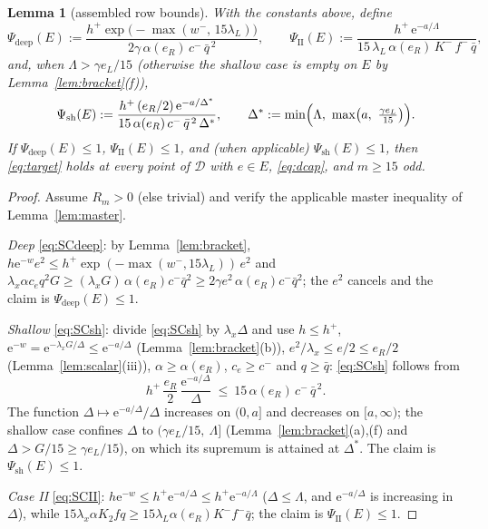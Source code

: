 \documentclass[11pt]{amsart}
\newtheorem{lemma}[theorem]{Lemma}
\newcommand{\eu}{\mathrm{e}}
\newcommand{\D}{\mathcal D}
\begin{document}
\begin{lemma}[assembled row bounds]\label{lem:rows}
With the constants above, define
\[
 \Psi_{\mathrm{deep}}(E):=
 \frac{h^+\exp\bigl(-\max(w^-,\,15\lambda_L)\bigr)}
      {2\gamma\,\alpha(e_R)\,c^-\,\bar q^{\,2}},
 \qquad
 \Psi_{\mathrm{II}}(E):=
 \frac{h^+\,\eu^{-a/\Lambda}}
      {15\,\lambda_L\,\alpha(e_R)\,K^-\,f^-\,\bar q},
\]
and, when $\Lambda>\gamma e_L/15$ (otherwise the shallow case is empty
on $E$ by Lemma~\ref{lem:bracket}(f)),
\[
 \Psi_{\mathrm{sh}}(E):=
 \frac{h^+\,(e_R/2)\,\eu^{-a/\Delta^*}}
      {15\,\alpha(e_R)\,c^-\,\bar q^{\,2}\,\Delta^*},
 \qquad
 \Delta^*:=\min\Bigl(\Lambda,\ \max\bigl(a,\ \tfrac{\gamma e_L}{15}\bigr)\Bigr).
\]
If $\Psi_{\mathrm{deep}}(E)\le1$, $\Psi_{\mathrm{II}}(E)\le1$, and (when
applicable) $\Psi_{\mathrm{sh}}(E)\le1$, then \eqref{eq:target} holds at
every point of $\D$ with $e\in E$, \eqref{eq:dcap}, and $m\ge15$ odd.
\end{lemma}

\begin{proof}
Assume $R_m>0$ (else trivial) and verify the applicable master inequality of
Lemma~\ref{lem:master}.

\emph{Deep} \eqref{eq:SCdeep}: by Lemma~\ref{lem:bracket},
$h\eu^{-w}e^2\le h^+\exp(-\max(w^-,15\lambda_L))\,e^2$ and
$\lambda_x\alpha c_eq^2G
\ge(\lambda_xG)\,\alpha(e_R)c^-\bar q^2
\ge2\gamma e^2\,\alpha(e_R)c^-\bar q^2$; the $e^2$ cancels and the claim is
$\Psi_{\mathrm{deep}}(E)\le1$.

\emph{Shallow} \eqref{eq:SCsh}: divide \eqref{eq:SCsh} by
$\lambda_x\Delta$ and use $h\le h^+$,
$\eu^{-w}=\eu^{-\lambda_xG/\Delta}\le\eu^{-a/\Delta}$
(Lemma~\ref{lem:bracket}(b)), $e^2/\lambda_x\le e/2\le e_R/2$
(Lemma~\ref{lem:scalar}(iii)), $\alpha\ge\alpha(e_R)$, $c_e\ge c^-$ and
$q\ge\bar q$: \eqref{eq:SCsh} follows from
\[
 h^+\,\frac{e_R}2\,\frac{\eu^{-a/\Delta}}{\Delta}
 \ \le\ 15\,\alpha(e_R)\,c^-\,\bar q^{\,2}.
\]
The function $\Delta\mapsto\eu^{-a/\Delta}/\Delta$ increases on $(0,a]$ and
decreases on $[a,\infty)$; the shallow case confines $\Delta$ to
$(\gamma e_L/15,\ \Lambda]$ (Lemma~\ref{lem:bracket}(a),(f) and
$\Delta>G/15\ge\gamma e_L/15$), on which its supremum is attained at
$\Delta^*$.  The claim is $\Psi_{\mathrm{sh}}(E)\le1$.

\emph{Case II} \eqref{eq:SCII}: $h\eu^{-w}\le h^+\eu^{-a/\Delta}\le
h^+\eu^{-a/\Lambda}$ ($\Delta\le\Lambda$, and $\eu^{-a/\Delta}$ is
increasing in $\Delta$), while
$15\lambda_x\alpha K_2fq\ge15\lambda_L\alpha(e_R)K^-f^-\bar q$; the claim is
$\Psi_{\mathrm{II}}(E)\le1$.
\end{proof}
\end{document}
